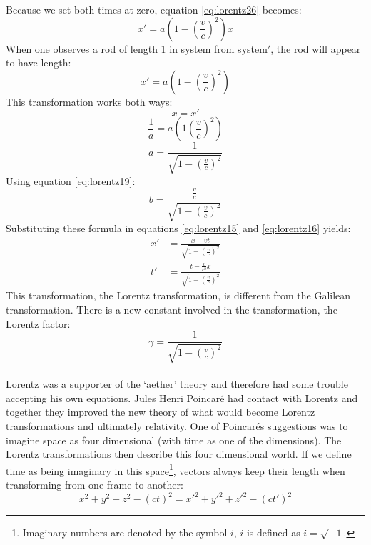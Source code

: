 \documentclass[12pt,a4paper]{article}
\numberwithin{equation}{section}
\numberwithin{figure}{section}
\numberwithin{table}{section}
\begin{document}
Because we set both times at zero, equation \ref{eq:lorentz26} becomes:
\begin{equation}\label{eq:lorentz29}
x' = a\left( 1-\left( \frac{v}{c}\right) ^2\right) x
\end{equation}
When one observes a rod of length 1 in system from system$'$, the rod will appear to have length:
\begin{equation}\label{eq:lorentz30}
x' = a\left( 1-\left( \frac{v}{c}\right) ^2\right)
\end{equation}
This transformation works both ways:
\begin{equation}\label{eq:lorentz31}
x=x'
\end{equation}
\begin{equation}\label{eq:lorentz32}
\frac{1}{a} = a\left( 1 \left( \frac{v}{c} \right)^2 \right) 
\end{equation}
\begin{equation}\label{eq:lorentz33}
a= \frac{1}{\sqrt{1-\left( \frac{v}{c} \right)^2}}
\end{equation}
Using equation \ref{eq:lorentz19}:
\begin{equation}\label{eq:lorentz34}
b= \frac{\frac{v}{c}}{\sqrt{1-\left( \frac{v}{c} \right)^2}}
\end{equation}
Substituting these formula in equations \ref{eq:lorentz15} and \ref{eq:lorentz16} yields:
\begin{align}\label{eq:lorentz3536}
x' &= \frac{x - vt}{\sqrt{1-\left( \frac{v}{c} \right)^2}} \\
t' &= \frac{t - \frac{v}{c^2}x}{\sqrt{1-\left( \frac{v}{c} \right)^2}}
\end{align}
This transformation, the Lorentz transformation, is different from the Galilean transformation. There is a new constant involved in the transformation, the Lorentz factor:
\begin{equation}\label{eq:lorentz37}
\gamma = \frac{1}{\sqrt{1-\left( \frac{v}{c} \right)^2}}
\end{equation}
\\ \indent Lorentz was a supporter of the `aether' theory and therefore had some trouble accepting his own equations. Jules Henri Poincar\'e had contact with Lorentz and together they improved the new theory of what would become Lorentz transformations and ultimately relativity. One of Poincar\'es suggestions was to imagine space as four dimensional (with time as one of the dimensions). The Lorentz transformations then describe this four dimensional world. If we define time as being imaginary in this space\footnote{Imaginary numbers are denoted by the symbol $i$, $i$ is defined as $i=\sqrt{-1}$.}, vectors always keep their length when transforming from one frame to another:
\begin{equation}\label{eq:lorentz38}
x^2+y^2+z^2-(ct)^2=x'^2+y'^2+z'^2-(ct')^2
\end{equation}
\end{document}
